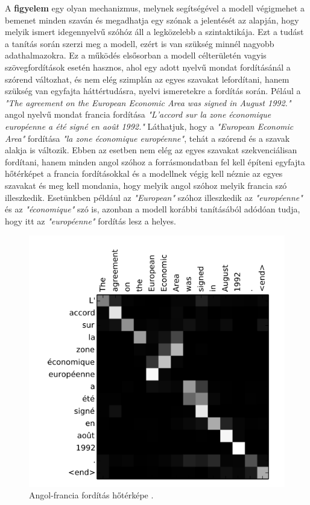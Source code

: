 A \textbf{figyelem} egy olyan mechanizmus, melynek segítségével a modell végigmehet a bemenet minden szaván és megadhatja egy szónak a jelentését az alapján, hogy melyik ismert idegennyelvű szóhóz áll a legközelebb a szintaktikája. Ezt a tudást a tanítás során szerzi meg a modell, ezért is van szükség minnél nagyobb adathalmazokra. Ez a működés elsősorban a modell célterületén vagyis  szövegfordítások esetén hasznos, ahol egy adott nyelvű mondat fordításánál a szórend változhat, és nem elég szimplán az egyes szavakat lefordítani, hanem szükség van egyfajta háttértudásra, nyelvi ismeretekre a fordítás során. Pélául a \textit{"The agreement on the European Economic Area was signed in August 1992."} angol nyelvű mondat francia fordítása \textit{"L'accord sur la zone économique européenne a été signé en août 1992."} Láthatjuk, hogy a \textit{"European Economic Area"} fordítása \textit{"la zone économique européenne"}, tehát a szórend és a szavak alakja is változik. Ebben az esetben nem elég az egyes szavakat szekvenciálisan fordítani, hanem minden angol szóhoz a forrásmondatban fel kell építeni egyfajta hőtérképet a francia fordításokkal és a modellnek végig kell néznie az egyes szavakat és meg kell mondania, hogy melyik angol szóhoz melyik francia szó illeszkedik. Esetünkben például az \textit{"European"} szóhoz illeszkedik az \textit{"européenne"} és az \textit{"économique"} szó is, azonban a modell korábbi tanításából adódóan tudja, hogy itt az \textit{"européenne"} fordítás lesz a helyes.

\begin{figure}[h]
\centering
\includegraphics[scale=0.9]{images/translate_heatmap.png}
\caption{Angol-francia fordítás hőtérképe \cite{translation}.}
\label{fig:translate_heatmap}
\end{figure}

